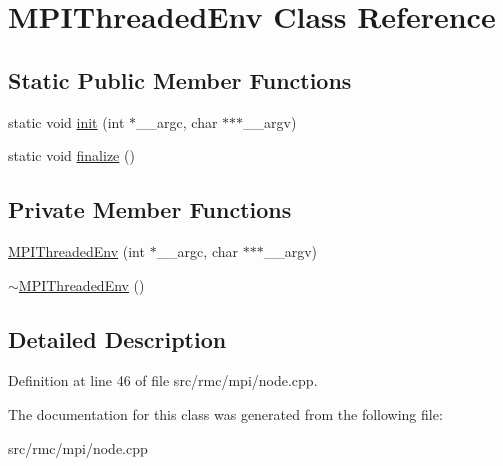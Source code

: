 \hypertarget{classMPIThreadedEnv}{
\section{MPIThreaded\-Env Class Reference}
\label{classMPIThreadedEnv}
}
\subsection*{Static Public Member Functions}
\begin{CompactItemize}
\item 
\hypertarget{classMPIThreadedEnv_ce2a77c94cd4304117d8241e97050b96}{
static void \hyperlink{classMPIThreadedEnv_ce2a77c94cd4304117d8241e97050b96}{init} (int $\ast$\_\-\_\-argc, char $\ast$$\ast$$\ast$\_\-\_\-argv)}
\label{classMPIThreadedEnv_ce2a77c94cd4304117d8241e97050b96}

\item 
\hypertarget{classMPIThreadedEnv_6be33c401734f7359724895c1c21ecd2}{
static void \hyperlink{classMPIThreadedEnv_6be33c401734f7359724895c1c21ecd2}{finalize} ()}
\label{classMPIThreadedEnv_6be33c401734f7359724895c1c21ecd2}

\end{CompactItemize}
\subsection*{Private Member Functions}
\begin{CompactItemize}
\item 
\hypertarget{classMPIThreadedEnv_b499d64e6e095f4bfebd91604d0d6d5c}{
\hyperlink{classMPIThreadedEnv_b499d64e6e095f4bfebd91604d0d6d5c}{MPIThreaded\-Env} (int $\ast$\_\-\_\-argc, char $\ast$$\ast$$\ast$\_\-\_\-argv)}
\label{classMPIThreadedEnv_b499d64e6e095f4bfebd91604d0d6d5c}

\item 
\hypertarget{classMPIThreadedEnv_9fc0c3ae7f4599d34cdb3a541f7b24fa}{
\hyperlink{classMPIThreadedEnv_9fc0c3ae7f4599d34cdb3a541f7b24fa}{$\sim$MPIThreaded\-Env} ()}
\label{classMPIThreadedEnv_9fc0c3ae7f4599d34cdb3a541f7b24fa}

\end{CompactItemize}


\subsection{Detailed Description}




Definition at line 46 of file src/rmc/mpi/node.cpp.

The documentation for this class was generated from the following file:\begin{CompactItemize}
\item 
src/rmc/mpi/node.cpp\end{CompactItemize}
